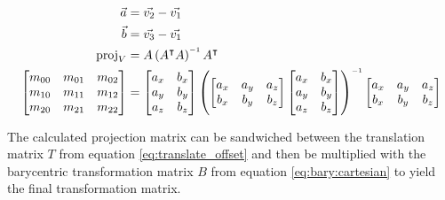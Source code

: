 \begin{align*}
    \vec{a} &= \vec{v_2} - \vec{v_1} \\
    \vec{b} &= \vec{v_3} - \vec{v_1} \\
    \text{proj}_V &= A\left(A\transpose A\right)\inverse A\transpose \\
    \begin{bmatrix}
        m_{00} & m_{01} & m_{02} \\
        m_{10} & m_{11} & m_{12} \\
        m_{20} & m_{21} & m_{22} \\
    \end{bmatrix}
    &=  \begin{bmatrix}
            a_x & b_x \\
            a_y & b_y \\
            a_z & b_z \\
        \end{bmatrix}
        \left(
            \begin{bmatrix}
                a_x & a_y & a_z \\
                b_x & b_y & b_z \\
            \end{bmatrix}
            \begin{bmatrix}
                a_x & b_x \\
                a_y & b_y \\
                a_z & b_z \\
            \end{bmatrix}
        \right)\inverse
        \begin{bmatrix}
            a_x & a_y & a_z \\
            b_x & b_y & b_z \\
        \end{bmatrix}
\end{align*}

The  calculated  projection  matrix  can be sandwiched between  the  translation
matrix $T$ from equation \ref{eq:translate_offset} and then be  multiplied  with
the  barycentric transformation matrix $B$ from equation \ref{eq:bary:cartesian}
to yield the final transformation matrix.

